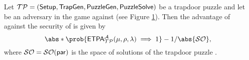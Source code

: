 \begin{definition}
  Let \(\mathcal{TP} = (\mathsf{Setup}, \mathsf{TrapGen}, \mathsf{PuzzleGen}, \mathsf{PuzzleSolve})\) be a trapdoor puzzle
  and let \advA{} be an adversary in the \ETPA{} game against \TP (see Figure \ref{fig:etpa}).
  Then the advantage of \advA{} against the \ETPA security of \TP is given by
  \begin{equation}
    \abs*{\prob{\ETPA{}_{\TP}^{\advA}(\mu,\rho,\lambda) \implies 1} - 1/\abs{\SO}},
  \end{equation}
  where \(\mathcal{SO} = \mathcal{SO}{}(\mathsf{par})\) is the space of solutions of the trapdoor puzzle \TP.
\end{definition}

\begin{figure}
  \begin{pcvstack}[center,space=0.5cm]
    \begin{pchstack}[space=1cm]
    \end{pchstack}
  \end{pcvstack}\caption{}\label{fig:etpa}
\end{figure}

